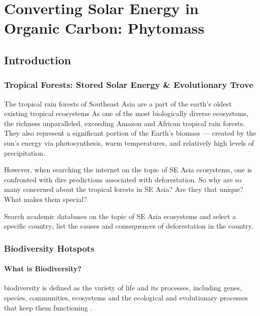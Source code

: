 \chapter[Phytomass]{Converting Solar Energy in Organic Carbon: Phytomass}

\section{Introduction}

\subsection{Tropical Forests: Stored Solar Energy \& Evolutionary Trove}

The tropical rain forests of Southeast Asia are a part of the earth's oldest existing tropical ecosystems As one of the most biologically diverse ecosystems, the richness unparalleled, exceeding Amazon and African tropical rain forests. They also represent a significant portion of the Earth's biomass --- created by the sun's energy via photosynthesis, warm temperatures, and relatively high levels of precipitation.

However, when searching the internet on the topic of SE Asia ecosystems, one is confronted with dire predictions associated with deforestation. So why are so many concerned about the tropical forests in SE Asia? Are they that unique? What makes them special?

\begin{exercise}
Search academic databases on the topic of SE Asia ecosystems and select a specific country; list the causes and consequences of deforestation in the country. 
\end{exercise}

\subsection{Biodiversity Hotspots}

\subsubsection{What is Biodiversity?}


\Gls{biodiversity} is defined as the variety of life and its processes, including genes, species, communities, ecosystems and the ecological and evolutionary processes that keep them functioning \citep{noss1994saving}. 
 
